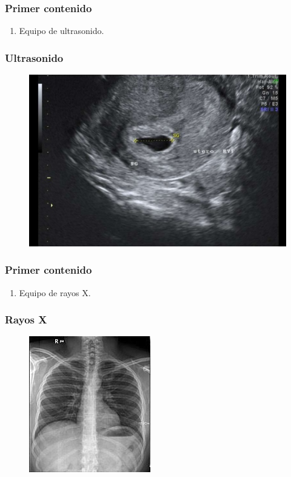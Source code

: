 \documentclass[14pt]{beamer}
\begin{document}
\begin{frame}
\frametitle{Primer contenido}
\vspace*{-1cm}
\begin{enumerate}[<+->]
\conti
\item Equipo de ultrasonido.
\seti
\end{enumerate}
\end{frame}
\begin{frame}
\frametitle{Ultrasonido}
\begin{figure}
    \centering
    \includegraphics[scale=0.3]{Imagenes/Instrumentacion_05.png}
\end{figure}
\end{frame}
\begin{frame}
\frametitle{Primer contenido}
\vspace*{-1cm}
\begin{enumerate}[<+->]
\conti
\item Equipo de rayos X.
\end{enumerate}
\end{frame}
\begin{frame}
\frametitle{Rayos X}
\begin{figure}
    \centering
    \includegraphics[scale=0.7]{Imagenes/Instrumentacion_07.jpg}
\end{figure}
\end{frame}
\end{document}
